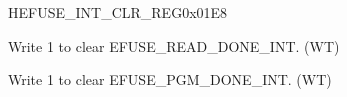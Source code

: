 \begin{register}{H}{EFUSE\_INT\_CLR\_REG}{0x01E8}\label{regdesc:EFUSEINTCLRREG}
%
%
%
\regnewline%
\begin{regdesc}\begin{reglist}
\label{fielddesc:EFUSEREADDONEINTCLR}\item [EFUSE\_READ\_DONE\_INT\_CLR] Write 1 to clear EFUSE\_READ\_DONE\_INT. (WT)
\label{fielddesc:EFUSEPGMDONEINTCLR}\item [EFUSE\_PGM\_DONE\_INT\_CLR] Write 1 to clear EFUSE\_PGM\_DONE\_INT. (WT)
\end{reglist}\end{regdesc}
\end{register}
